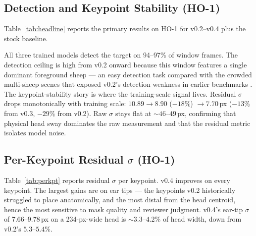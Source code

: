 \documentclass[11pt]{article}
\begin{document}
\subsection{Detection and Keypoint Stability (HO-1)}
Table~\ref{tab:headline} reports the primary results on HO-1 for v0.2--v0.4
plus the stock baseline.

\begin{table}[t]
  \centering
  \caption{HO-1 held-out results. Stock-YOLO detection is the COCO-sheep-class
  rate (Section~\ref{sec:stock}); the trained models have a single
  \texttt{sheep\_head} class. Stock produces no keypoints.}
  \label{tab:headline}
\end{table}

All three trained models detect the target on 94--97\% of window frames. The
detection ceiling is high from v0.2 onward because this window features a single
dominant foreground sheep --- an easy detection task compared with the crowded
multi-sheep scenes that exposed v0.2's detection weakness in earlier benchmarks
\citep{v03benchmark}. The keypoint-stability story is where the training-scale
signal lives. Residual $\sigma$ drops monotonically with training scale:
$10.89 \rightarrow 8.90$ ($-18\%$) $\rightarrow 7.70$\,px ($-13\%$ from v0.3,
$-29\%$ from v0.2). Raw $\sigma$ stays flat at ${\sim}46$--$49$\,px, confirming
that physical head sway dominates the raw measurement and that the residual
metric isolates model noise.

\subsection{Per-Keypoint Residual $\sigma$ (HO-1)}
Table~\ref{tab:perkpt} reports residual $\sigma$ per keypoint. v0.4 improves on
every keypoint. The largest gains are on ear tips --- the keypoints v0.2
historically struggled to place anatomically, and the most distal from the head
centroid, hence the most sensitive to mask quality and reviewer judgment. v0.4's
ear-tip $\sigma$ of 7.66--9.78\,px on a 234-px-wide head is ${\sim}3.3$--$4.2\%$
of head width, down from v0.2's $5.3$--$5.4\%$.
\end{document}
